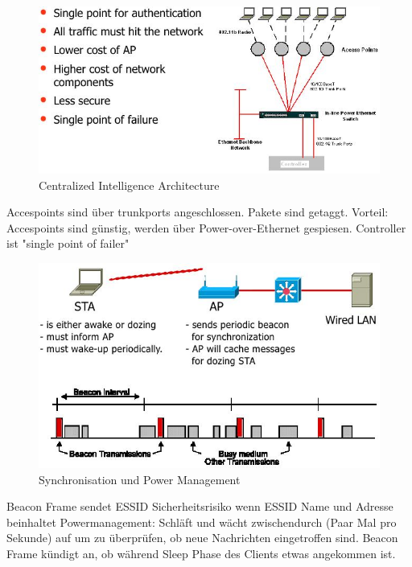 \documentclass[ngerman,a4paper,12pt]{scrreprt}
\begin{document}
\begin{figure}[H]
	\centering
	 \includegraphics[width=\textwidth]{img/V6.3.jpg}
	\caption{Centralized Intelligence Architecture}
	\label{}
\end{figure}

\ul
	\li Accespoints sind über trunkports angeschlossen.
	\li Pakete sind getaggt.
	\li Vorteil: Accespoints sind günstig, werden über Power-over-Ethernet gespiesen.
	\li Controller ist "single point of failer"
\ulE

\begin{figure}[H]
	\centering
	 \includegraphics[width=\textwidth]{img/V6.4.jpg}
	\caption{Synchronisation und Power Management}
	\label{}
\end{figure}
\ul
	\li Beacon Frame sendet ESSID \ra Sicherheitsrisiko wenn ESSID Name und Adresse beinhaltet
	\li Powermanagement: Schläft und wächt zwischendurch (Paar Mal pro Sekunde) auf um zu überprüfen, ob neue Nachrichten eingetroffen sind.
	\li Beacon Frame kündigt an, ob während Sleep Phase des Clients etwas angekommen ist.
\ulE
\end{document}
